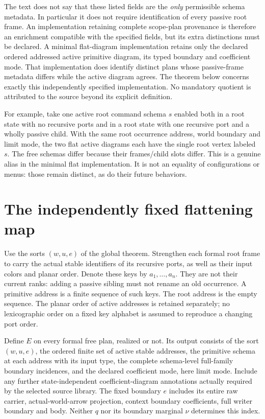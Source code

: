 \documentclass[11pt]{article}
\begin{document}
The text does not say that these listed fields are the \emph{only} permissible schema metadata. In particular it does not require identification of every passive root frame. An implementation retaining complete scope-plan provenance is therefore an enrichment compatible with the specified fields, but its extra distinctions must be declared. A minimal flat-diagram implementation retains only the declared ordered addressed active primitive diagram, its typed boundary and coefficient mode. That implementation does identify distinct plans whose passive-frame metadata differs while the active diagram agrees. The theorem below concerns exactly this independently specified implementation. No mandatory quotient is attributed to the source beyond its explicit definition.

For example, take one active root command schema $s$ enabled both in a root state with no recursive ports and in a root state with one recursive port and a wholly passive child. With the same root occurrence address, world boundary and limit mode, the two flat active diagrams each have the single root vertex labeled $s$. The free schemas differ because their frames/child slots differ. This is a genuine alias in the minimal flat implementation. It is not an equality of configurations or menus: those remain distinct, as do their future behaviors.

\section{The independently fixed flattening map}
Use the sorts $(w,u,e)$ of the global theorem. Strengthen each formal root frame to carry the actual stable identifiers of its recursive ports, as well as their input colors and planar order. Denote these keys by $a_1,\ldots,a_n$. They are not their current ranks: adding a passive sibling must not rename an old occurrence. A primitive address is a finite sequence of such keys. The root address is the empty sequence. The planar order of active addresses is retained separately; no lexicographic order on a fixed key alphabet is assumed to reproduce a changing port order.

Define $E$ on every formal free plan, realized or not. Its output consists of the sort $(w,u,e)$, the ordered finite set of active stable addresses, the primitive schema at each address with its input type, the complete schema-level full-family boundary incidences, and the declared coefficient mode, here limit mode. Include any further state-independent coefficient-diagram annotations actually required by the selected source library. The fixed boundary $e$ includes its entire raw carrier, actual-world-arrow projection, context boundary coefficients, full writer boundary and body. Neither $q$ nor its boundary marginal $\nu$ determines this index.
\end{document}
